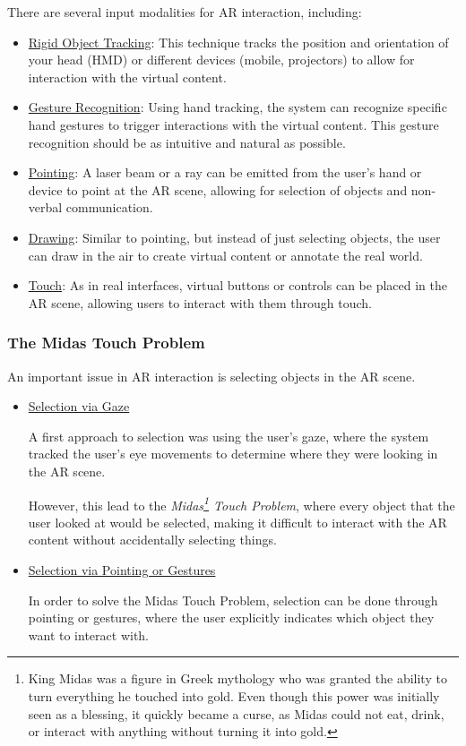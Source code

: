 There are several input modalities for AR interaction, including:
\begin{itemize}
    \item \ul{Rigid Object Tracking}: This technique tracks the position and orientation of your head (HMD) or different devices (mobile, projectors) to allow for interaction with the virtual content.
    \item \ul{Gesture Recognition}: Using hand tracking, the system can recognize specific hand gestures to trigger interactions with the virtual content. This gesture recognition should be as intuitive and natural as possible.
    \item \ul{Pointing}: A laser beam or a ray can be emitted from the user's hand or device to point at the AR scene, allowing for selection of objects and non-verbal communication.
    \item \ul{Drawing}: Similar to pointing, but instead of just selecting objects, the user can draw in the air to create virtual content or annotate the real world.
    \item \ul{Touch}: As in real interfaces, virtual buttons or controls can be placed in the AR scene, allowing users to interact with them through touch.
\end{itemize}

\subsubsection{The Midas Touch Problem}

An important issue in AR interaction is selecting objects in the AR scene.
\begin{itemize}
    \item \ul{Selection via Gaze}
    
    A first approach to selection was using the user's gaze, where the system tracked the user's eye movements to determine where they were looking in the AR scene.

    However, this lead to the \emph{Midas\footnote{King Midas was a figure in Greek mythology who was granted the ability to turn everything he touched into gold. Even though this power was initially seen as a blessing, it quickly became a curse, as Midas could not eat, drink, or interact with anything without turning it into gold.}
    Touch Problem}, where every object that the user looked at would be selected, making it difficult to interact with the AR content without accidentally selecting things.

    \item \ul{Selection via Pointing or Gestures}
    
    In order to solve the Midas Touch Problem, selection can be done through pointing or gestures, where the user explicitly indicates which object they want to interact with.
\end{itemize}